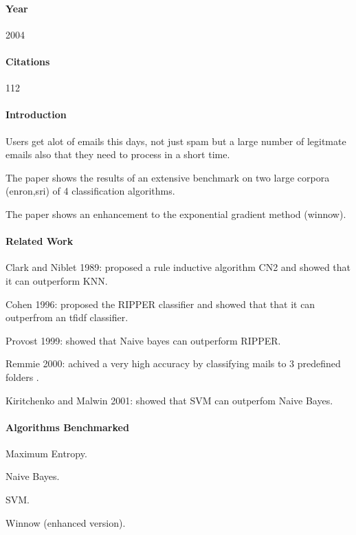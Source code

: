 \documentclass[12pt]{article}
\newenvironment{my_itemize}
{\begin{itemize}
  \setlength{\itemsep}{0cm}
  \setlength{\parskip}{0cm}}
{\end{itemize}}
\begin{document}
\paragraph{Year} 2004
\paragraph{Citations} 112
\paragraph{Introduction}
\begin{my_itemize}
  \item Users get alot of emails this days, not just spam but a large number of 
	legitmate emails also that they need to process in a short time.
  \item The paper shows the results of an extensive benchmark on two large corpora 
	(enron,sri) of 4 classification algorithms.
  \item The paper shows an enhancement to the exponential gradient method (winnow).
\end{my_itemize}

\paragraph{Related Work}
\begin{my_itemize}
  \item Clark and Niblet 1989: proposed a rule inductive algorithm CN2 and 
	showed that it can outperform KNN.
  \item Cohen 1996: proposed the RIPPER classifier and showed that that it 
	can outperfrom an tfidf classifier.
  \item Provost 1999: showed that Naive bayes can outperform RIPPER.
  \item Remmie 2000: achived a very high accuracy by classifying mails to 
	3 predefined folders .
  \item Kiritchenko and Malwin 2001: showed that SVM can outperfom Naive Bayes.
\end{my_itemize}


\paragraph{Algorithms Benchmarked}
\begin{my_itemize}
  \item Maximum Entropy.
  \item Naive Bayes.
  \item SVM.
  \item Winnow (enhanced version).
\end{my_itemize}
\end{document}
